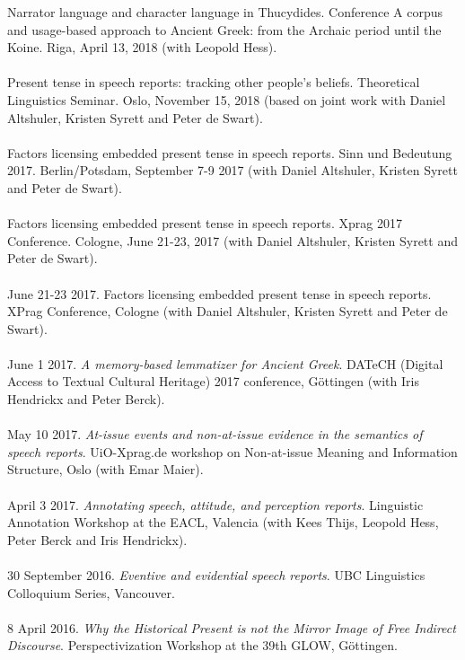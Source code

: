 \documentclass[a4paper,11pt]{article}
\begin{document}
Narrator language and character language in Thucydides. Conference A corpus and usage-based approach to Ancient Greek: from the Archaic period until the Koine. Riga, April 13, 2018 (with Leopold Hess).\\\\
Present tense in speech reports: tracking other people's beliefs. Theoretical Linguistics Seminar. Oslo, November 15, 2018 (based on joint work with Daniel Altshuler, Kristen Syrett and Peter de Swart).\\\\
Factors licensing embedded present tense in speech reports. Sinn und Bedeutung 2017. Berlin/Potsdam, September 7-9 2017 (with Daniel Altshuler, Kristen Syrett and Peter de Swart).\\\\
Factors licensing embedded present tense in speech reports. Xprag 2017 Conference. Cologne, June 21-23, 2017 (with Daniel Altshuler, Kristen Syrett and Peter de Swart).\\\\
June 21-23 2017. Factors licensing embedded present tense in speech reports. XPrag Conference, Cologne (with Daniel Altshuler, Kristen Syrett and Peter de Swart).\\\\
June 1 2017. \emph{A memory-based lemmatizer for Ancient Greek}. DATeCH (Digital Access to Textual Cultural Heritage) 2017 conference, G\"ottingen (with Iris Hendrickx and Peter Berck).\\\\
May 10 2017. \emph{At-issue events and non-at-issue evidence in the semantics of speech reports}. UiO-Xprag.de workshop on Non-at-issue Meaning and Information Structure, Oslo (with Emar Maier).\\\\
April 3 2017.  \emph{Annotating speech, attitude, and perception reports}. Linguistic Annotation Workshop at the EACL, Valencia (with Kees Thijs, Leopold Hess, Peter Berck and Iris Hendrickx).\\\\
30 September 2016. \emph{Eventive and evidential speech reports}. UBC Linguistics Colloquium Series, Vancouver. \\\\
8 April 2016. \emph{Why the Historical Present is not the Mirror Image of Free Indirect Discourse}. Perspectivization Workshop at the 39th GLOW, G\"ottingen.\\\\
\end{document}
